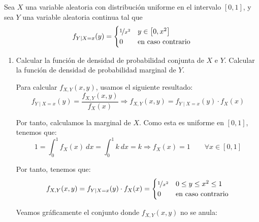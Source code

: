 \begin{ejercicio}
    Sea $X$ una variable aleatoria con distribución uniforme en el intervalo $[0,1]$, y sea $Y$ una variable aleatoria continua tal que
    \begin{equation*}
        f_{Y\mid X=x}(y) = \begin{cases}
            \nicefrac{1}{x^2} & y \in \left[0, x^2\right]\\
            0 & \text{en caso contrario}
        \end{cases}
    \end{equation*}
    \begin{enumerate}
        \item\label{ej:4.8.a} Calcular la función de densidad de probabilidad conjunta de $X$ e $Y$. Calcular la función de densidad de probabilidad marginal de $Y$.
        
        Para calcular $f_{X,Y}(x,y)$, usamos el siguiente resultado:
        \begin{equation*}
            f_{Y\mid X=x}(y) = \dfrac{f_{X,Y}(x,y)}{f_X(x)}
            \Longrightarrow
            f_{X,Y}(x,y) = f_{Y\mid X=x}(y)\cdot f_X(x)
        \end{equation*}

        Por tanto, calculamos la marginal de $X$. Como esta es uniforme en $[0,1]$, tenemos que:
        \begin{equation*}
            1=\int_{0}^{1} f_X(x) \ dx = \int_{0}^{1} k \ dx = k
            \Longrightarrow f_X(x) = 1\qquad \forall x\in[0,1]
        \end{equation*}

        Por tanto, tenemos que:
        \begin{equation*}
            f_{X,Y}(x,y) = f_{Y\mid X=x}(y)\cdot f_X(x) = \begin{cases}
                \nicefrac{1}{x^2} & 0\leq y\leq x^2\leq 1\\
                0 & \text{en caso contrario}
            \end{cases}
        \end{equation*}

        Veamos gráficamente el conjunto donde $f_{X,Y}(x,y)$ no se anula:
        \begin{figure}[H]
            \centering
\end{figure}
\end{enumerate}
\end{ejercicio}
